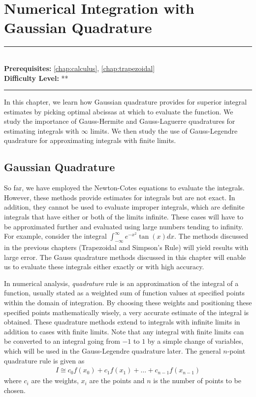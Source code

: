 \documentclass[book.tex]{subfiles}
\begin{document}
\chapter{Numerical Integration with Gaussian Quadrature}
\label{chap:gauss_quadrature}
\noindent\rule{11cm}{0.4pt} \\
\textbf{Prerequisites:} \autoref{chap:calculus}, \autoref{chap:trapezoidal} \\
\textbf{Difficulty Level:} ** \\
\noindent\rule{11cm}{0.4pt}
\vspace{5mm}

In this chapter, we learn how Gaussian quadrature provides for superior integral estimates by picking optimal abcissas at which to evaluate the function. We study the importance of Gauss-Hermite and Gauss-Laguerre quadratures for estimating integrals with $\infty$ limits. We then study the use of Gauss-Legendre quadrature for approximating integrals with finite limits.

\section{Gaussian Quadrature}

So far, we have employed the Newton-Cotes equations to evaluate the integrals. However, these methods provide estimates for integrals but are not exact. In addition, they cannot be used to evaluate improper integrals, which are definite integrals that have either or both of the limits infinite. These cases will have to be approximated further and evaluated using large numbers tending to infinity. For example, consider the integral $\int_{-\infty}^{\infty}e^{-x^2}\tan(x)dx$. The methods discussed in the previous chapters (Trapezoidal and Simpson's Rule) will yield results with large error. The Gauss quadrature methods discussed in this chapter will enable us to evaluate these integrals either exactly or with high accuracy.

In numerical analysis, \textit{quadrature} rule is an approximation of the integral of a function, usually stated as a weighted sum of function values at specified points within the domain of integration. By choosing these weights and positioning these specified points mathematically wisely, a very accurate estimate of the integral is obtained. These quadrature methods extend to integrals with infinite limits in addition to cases with finite limits. Note that any integral with finite limits can be converted to an integral going from $-1$ to $1$ by a simple change of variables, which will be used in the Gauss-Legendre quadrature later. The general $n$-point quadrature rule is given as
\begin{align}
I \cong c_0f(x_0) + c_1f(x_1) + \dots + c_{n-1}f(x_{n-1})
\end{align}
where $c_i$ are the weights, $x_i$ are the points and $n$ is the number of points to be chosen.
\end{document}
